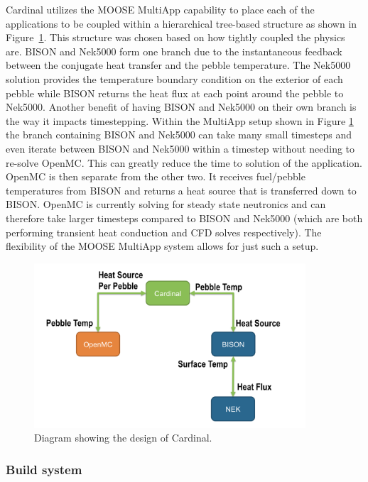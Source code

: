Cardinal utilizes the MOOSE MultiApp capability to place each of the applications to be coupled within a hierarchical tree-based structure as shown in Figure~\ref{f:cardinal}. This structure was chosen based on how tightly coupled the physics are. BISON and Nek5000 form one branch due to the instantaneous feedback between the conjugate heat transfer and the pebble temperature. The Nek5000 solution provides the temperature boundary condition on the exterior of each pebble while BISON returns the heat  flux at each point around the pebble to Nek5000. Another benefit of having BISON and Nek5000 on their own branch is the way it impacts timestepping. Within the MultiApp setup shown in Figure \ref{f:cardinal} the branch containing BISON and Nek5000 can take many small timesteps and even iterate between BISON and Nek5000 within a timestep without needing to re-solve OpenMC. This can greatly reduce the time to solution of the application. OpenMC is then separate from the other two. It receives fuel/pebble temperatures from BISON and returns a heat source that is transferred down to BISON. OpenMC is currently solving for steady state neutronics and can therefore take larger timesteps compared to BISON and Nek5000 (which are both performing transient heat conduction and CFD solves respectively). The flexibility of the MOOSE MultiApp system allows for just such a setup.

\begin{figure}[!h]
\centering
\includegraphics[clip=true,width=0.9\textwidth]{Figures/cardinal}
\caption{Diagram showing the design of Cardinal.}
\label{f:cardinal}
\end{figure}


\subsubsection{Build system}
\label{ss:c2}

